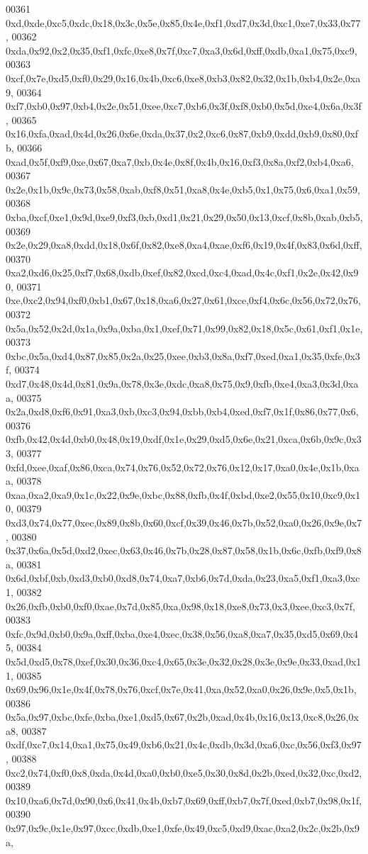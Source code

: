 \begin{DoxyCode}
00361   0xd,0xde,0xc5,0xdc,0x18,0x3c,0x5e,0x85,0x4e,0xf1,0xd7,0x3d,0xc1,0xe7,0x33,0x77,
00362   0xda,0x92,0x2,0x35,0xf1,0xfc,0xe8,0x7f,0xc7,0xa3,0x6d,0xff,0xdb,0xa1,0x75,0xc9,
00363   0xcf,0x7e,0xd5,0xf0,0x29,0x16,0x4b,0xc6,0xe8,0xb3,0x82,0x32,0x1b,0xb4,0x2e,0xa9,
00364   0xf7,0xb0,0x97,0xb4,0x2e,0x51,0xee,0xc7,0xb6,0x3f,0xf8,0xb0,0x5d,0xe4,0x6a,0x3f,
00365   0x16,0xfa,0xad,0x4d,0x26,0x6e,0xda,0x37,0x2,0xc6,0x87,0xb9,0xdd,0xb9,0x80,0xfb,
00366   0xad,0x5f,0xf9,0xe,0x67,0xa7,0xb,0x4e,0x8f,0x4b,0x16,0xf3,0x8a,0xf2,0xb4,0xa6,
00367   0x2e,0x1b,0x9c,0x73,0x58,0xab,0xf8,0x51,0xa8,0x4e,0xb5,0x1,0x75,0x6,0xa1,0x59,
00368   0xba,0xcf,0xe1,0x9d,0xe9,0xf3,0xb,0xd1,0x21,0x29,0x50,0x13,0xcf,0x8b,0xab,0xb5,
00369   0x2e,0x29,0xa8,0xdd,0x18,0x6f,0x82,0xe8,0xa4,0xae,0xf6,0x19,0x4f,0x83,0x6d,0xff,
00370   0xa2,0xd6,0x25,0xf7,0x68,0xdb,0xef,0x82,0xcd,0xc4,0xad,0x4c,0xf1,0x2e,0x42,0x90,
00371   0xe,0xc2,0x94,0xf0,0xb1,0x67,0x18,0xa6,0x27,0x61,0xce,0xf4,0x6c,0x56,0x72,0x76,
00372   0x5a,0x52,0x2d,0x1a,0x9a,0xba,0x1,0xef,0x71,0x99,0x82,0x18,0x5c,0x61,0xf1,0x1e,
00373   0xbc,0x5a,0xd4,0x87,0x85,0x2a,0x25,0xee,0xb3,0x8a,0xf7,0xed,0xa1,0x35,0xfe,0x3f,
00374   0xd7,0x48,0x4d,0x81,0x9a,0x78,0x3e,0xdc,0xa8,0x75,0x9,0xfb,0xe4,0xa3,0x3d,0xaa,
00375   0x2a,0xd8,0xf6,0x91,0xa3,0xb,0xc3,0x94,0xbb,0xb4,0xed,0xf7,0x1f,0x86,0x77,0x6,
00376   0xfb,0x42,0x4d,0xb0,0x48,0x19,0xdf,0x1e,0x29,0xd5,0x6e,0x21,0xca,0x6b,0x9c,0x33,
00377   0xfd,0xee,0xaf,0x86,0xca,0x74,0x76,0x52,0x72,0x76,0x12,0x17,0xa0,0x4e,0x1b,0xaa,
00378   0xaa,0xa2,0xa9,0x1c,0x22,0x9e,0xbc,0x88,0xfb,0x4f,0xbd,0xe2,0x55,0x10,0xc9,0x10,
00379   0xd3,0x74,0x77,0xec,0x89,0x8b,0x60,0xcf,0x39,0x46,0x7b,0x52,0xa0,0x26,0x9e,0x7,
00380   0x37,0x6a,0x5d,0xd2,0xec,0x63,0x46,0x7b,0x28,0x87,0x58,0x1b,0x6c,0xfb,0xf9,0x8a,
00381   0x6d,0xbf,0xb,0xd3,0xb0,0xd8,0x74,0xa7,0xb6,0x7d,0xda,0x23,0xa5,0xf1,0xa3,0xc1,
00382   0x26,0xfb,0xb0,0xf0,0xae,0x7d,0x85,0xa,0x98,0x18,0xe8,0x73,0x3,0xee,0xc3,0x7f,
00383   0xfc,0x9d,0xb0,0x9a,0xff,0xba,0xe4,0xec,0x38,0x56,0xa8,0xa7,0x35,0xd5,0x69,0x45,
00384   0x5d,0xd5,0x78,0xef,0x30,0x36,0xc4,0x65,0x3e,0x32,0x28,0x3e,0x9e,0x33,0xad,0x11,
00385   0x69,0x96,0x1e,0x4f,0x78,0x76,0xcf,0x7e,0x41,0xa,0x52,0xa0,0x26,0x9e,0x5,0x1b,
00386   0x5a,0x97,0xbc,0xfe,0xba,0xe1,0xd5,0x67,0x2b,0xad,0x4b,0x16,0x13,0xc8,0x26,0xa8,
00387   0xdf,0xc7,0x14,0xa1,0x75,0x49,0xb6,0x21,0x4c,0xdb,0x3d,0xa6,0xc,0x56,0xf3,0x97,
00388   0xc2,0x74,0xf0,0x8,0xda,0x4d,0xa0,0xb0,0xe5,0x30,0x8d,0x2b,0xed,0x32,0xc,0xd2,
00389   0x10,0xa6,0x7d,0x90,0x6,0x41,0x4b,0xb7,0x69,0xff,0xb7,0x7f,0xed,0xb7,0x98,0x1f,
00390   0x97,0x9c,0x1e,0x97,0xcc,0xdb,0xe1,0xfe,0x49,0xc5,0xd9,0xac,0xa2,0x2c,0x2b,0x9a,

\end{DoxyCode}
